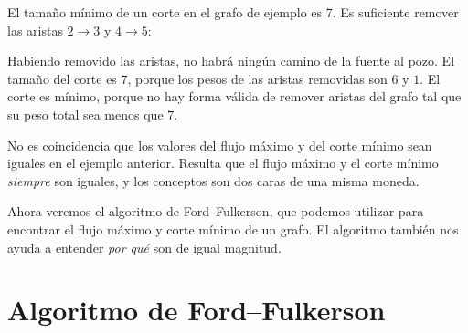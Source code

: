 El tamaño mínimo de un corte en el grafo de ejemplo es 7. Es suficiente
remover las aristas $2 \rightarrow 3$ y $4 \rightarrow 5$:

\begin{center}
\end{center}

Habiendo removido las aristas, no habrá ningún camino de la fuente
al pozo. El tamaño del corte es $7$, porque los pesos de las aristas
removidas son $6$ y $1$. El corte es mínimo, porque no hay forma
válida de remover aristas del grafo tal que su peso total sea
menos que $7$.

No es coincidencia que los valores del flujo máximo y del corte mínimo
sean iguales en el ejemplo anterior. Resulta que el flujo máximo y el
corte mínimo \emph{siempre} son iguales, y los conceptos son dos caras
de una misma moneda.

Ahora veremos el algoritmo de Ford--Fulkerson, que podemos utilizar
para encontrar el flujo máximo y corte mínimo de un grafo. El algoritmo
también nos ayuda a entender \emph{por qué} son de igual magnitud.

\section{Algoritmo de Ford--Fulkerson}

